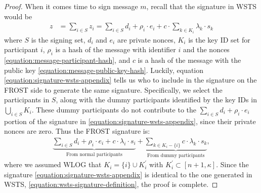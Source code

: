 \documentclass{article}
\begin{document}
\begin{proof}
When it comes time to sign message $m$, recall that the signature in WSTS would be
\begin{align}\label{equation:signature-wsts-appendix}
    z & = \sum_{i \in S}^{} z_{i} 
   = \sum_{i \in S}^{} d_{i} + \rho_{i} \cdot e_{i} + c \cdot \sum_{k \in K_i}^{} \lambda_{k} \cdot s_{k}
\end{align}
where $S$ is the signing set, $d_i$ and $e_i$ are private nonces, $K_i$ is the key ID set for participant $i$, $\rho_i$ is a hash of the message with identifier $i$ and the nonces \eqref{equation:message-participant-hash}, and $c$ is a hash of the message with the public key \eqref{equation:message-public-key-hash}. Luckily, equation \eqref{equation:signature-wsts-appendix} tells us who to include in the signature on the FROST side to generate the same signature. Specifically, we select the participants in $S$, along with the dummy participants identified by the key IDs in $\bigcup_{i \in S} K_i$. These dummy participants do not contribute to the $\sum_{i \in S}^{} d_{i} + \rho_{i} \cdot e_{i}$ portion of the signature in \eqref{equation:signature-wsts-appendix}, since their private nonces are zero. Thus the FROST signature is:
\begin{align}\label{equation:signature-frost-appendix}
   \underbrace{\sum_{i \in S}^{} d_{i} + \rho_{i} \cdot e_{i} + c \cdot \lambda_{i} \cdot s_{i}}_{\text{From normal participants}} + \underbrace{\sum_{k \in K_i - \{i\}}^{} c \cdot \lambda_{k} \cdot s_{k}}_{\text{From dummy participants}},
\end{align}
where we assumed WLOG that $K_i = \{ i \} \cup K_i^{\prime}$ with $K_i^\prime \subset [n + 1, \kappa]$. Since the signature \eqref{equation:signature-wsts-appendix} is identical to the one generated in WSTS, \eqref{equation:wsts-signature-definition}, the proof is complete.
\end{proof}

\end{document}
